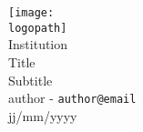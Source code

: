 \documentclass[12pt]{article}
\title{\titlename}
\author{\authorname}
\date{\datevalue}
\makeatletter
\def \titlename {Title}
\def \subtitle {Subtitle}
\def \authorname {author - {\tt author@email}}
\def \logopath {/path/to/logo.png}
\def \institutionname {Institution}
\def \datevalue {jj/mm/yyyy}
\makeatother
\begin{document}
\begin{titlepage}
    \begin{center}
        \texttt{[image: \\logopath]}\\[0.5cm]
        {\Huge \institutionname\\[0.5cm]
        \titlename}\\[2cm]
        \linespread{1.2}\LARGE {
        \subtitle}
        \linespread{1}~\\[2cm]
        {\Large\authorname}\\[1cm] 
        \vfill
        {\Large\datevalue}
    \end{center}
\end{titlepage}

\pagestyle{fancy}
\pagebreak

\end{document}
